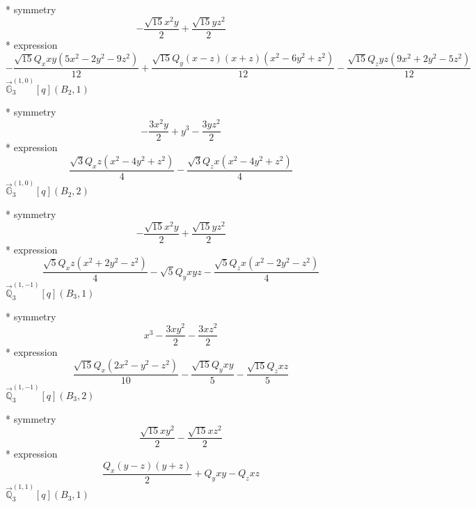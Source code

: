 \documentclass[fleqn,8pt]{jsarticle}
\begin{document}
\noindent\quad ** symmetry
\begin{dmath*}
- \frac{\sqrt{15} x^{2} y}{2} + \frac{\sqrt{15} y z^{2}}{2}
\end{dmath*}
\noindent\quad ** expression
\begin{dmath*}
- \frac{\sqrt{15} Q_{x} x y \left(5 x^{2} - 2 y^{2} - 9 z^{2}\right)}{12} + \frac{\sqrt{15} Q_{y} \left(x - z\right) \left(x + z\right) \left(x^{2} - 6 y^{2} + z^{2}\right)}{12} - \frac{\sqrt{15} Q_{z} y z \left(9 x^{2} + 2 y^{2} - 5 z^{2}\right)}{12}
\end{dmath*}
\noindent\quad $\vec{\mathbb{G}}_{3}^{(1,0)}[q](B_{2},1)$

\noindent\quad ** symmetry
\begin{dmath*}
- \frac{3 x^{2} y}{2} + y^{3} - \frac{3 y z^{2}}{2}
\end{dmath*}
\noindent\quad ** expression
\begin{dmath*}
\frac{\sqrt{3} Q_{x} z \left(x^{2} - 4 y^{2} + z^{2}\right)}{4} - \frac{\sqrt{3} Q_{z} x \left(x^{2} - 4 y^{2} + z^{2}\right)}{4}
\end{dmath*}
\noindent\quad $\vec{\mathbb{G}}_{3}^{(1,0)}[q](B_{2},2)$

\noindent\quad ** symmetry
\begin{dmath*}
- \frac{\sqrt{15} x^{2} y}{2} + \frac{\sqrt{15} y z^{2}}{2}
\end{dmath*}
\noindent\quad ** expression
\begin{dmath*}
\frac{\sqrt{5} Q_{x} z \left(x^{2} + 2 y^{2} - z^{2}\right)}{4} - \sqrt{5} Q_{y} x y z - \frac{\sqrt{5} Q_{z} x \left(x^{2} - 2 y^{2} - z^{2}\right)}{4}
\end{dmath*}
\noindent\quad $\vec{\mathbb{Q}}_{3}^{(1,-1)}[q](B_{3},1)$

\noindent\quad ** symmetry
\begin{dmath*}
x^{3} - \frac{3 x y^{2}}{2} - \frac{3 x z^{2}}{2}
\end{dmath*}
\noindent\quad ** expression
\begin{dmath*}
\frac{\sqrt{15} Q_{x} \left(2 x^{2} - y^{2} - z^{2}\right)}{10} - \frac{\sqrt{15} Q_{y} x y}{5} - \frac{\sqrt{15} Q_{z} x z}{5}
\end{dmath*}
\noindent\quad $\vec{\mathbb{Q}}_{3}^{(1,-1)}[q](B_{3},2)$

\noindent\quad ** symmetry
\begin{dmath*}
\frac{\sqrt{15} x y^{2}}{2} - \frac{\sqrt{15} x z^{2}}{2}
\end{dmath*}
\noindent\quad ** expression
\begin{dmath*}
\frac{Q_{x} \left(y - z\right) \left(y + z\right)}{2} + Q_{y} x y - Q_{z} x z
\end{dmath*}
\noindent\quad $\vec{\mathbb{Q}}_{3}^{(1,1)}[q](B_{3},1)$
\end{document}
